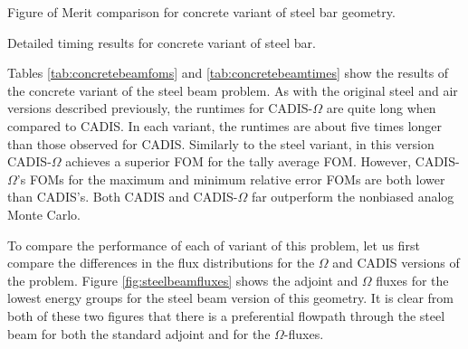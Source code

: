 \begin{table}[h!]
  \centering
  
  \caption[Figure of Merit comparison for concrete variant of steel bar geometry.]
  {Figure of Merit comparison for concrete variant of steel bar geometry.}
  \label{tab:concretebeamfoms}
\end{table}

\begin{table}[h!]
  \centering
  
  \caption[Detailed timing results for concrete variant of steel bar.]
  {Detailed timing results for concrete variant of steel bar.}
  \label{tab:concretebeamtimes}
\end{table}

Tables \ref{tab:concretebeamfoms} and \ref{tab:concretebeamtimes} show the
results of the concrete variant of the steel beam problem. As with the original
steel and air versions described previously, the runtimes for CADIS-$\Omega$ are quite
long when compared to CADIS. In each variant, the runtimes are about five times
longer than those observed for CADIS. Similarly to the steel variant, in this
version CADIS-$\Omega$ achieves a superior FOM for the tally average FOM.
However, CADIS-$\Omega$'s FOMs for the maximum and minimum relative error FOMs
are both lower than CADIS's. Both CADIS and CADIS-$\Omega$ far outperform the
nonbiased analog Monte Carlo.

To compare the performance of each of variant of this problem, let us first
compare the differences in the flux distributions for the $\Omega$ and CADIS
versions of the problem. Figure \ref{fig:steelbeamfluxes} shows the
adjoint and $\Omega$ fluxes for the lowest energy groups for
the steel beam version of this geometry. It is clear from both of
these two figures that there is a preferential flowpath through the steel beam
for both the standard adjoint and for the $\Omega$-fluxes.

